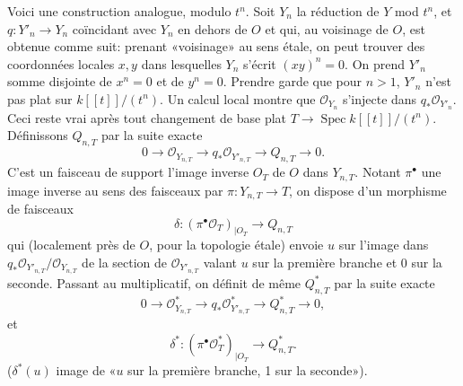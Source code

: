 \documentclass[11pt,leqno]{article}
\DeclareMathOperator{\Spec}{Spec}
\newcommand{\OO}{\mathcal O}
\begin{document}
Voici une construction analogue, modulo $t^n$. Soit $Y_n$ la réduction de $Y$ mod $t^n$, et $q:Y'_n\to Y_n$ coïncidant avec $Y_n$ en dehors de $O$ et qui, au voisinage de $O$, est obtenue comme suit: prenant «voisinage» au sens étale, on peut trouver des coordonnées locales $x,y$ dans lesquelles $Y_n$ s'écrit $(xy)^n=0$. On prend $Y'_n$ somme disjointe de $x^n=0$ et de $y^n=0$. Prendre garde que pour $n>1$, $Y'_n$ n'est pas plat sur $k[[t]]/(t^n)$. Un calcul local montre que $\OO_{Y_n}$ s'injecte dans $q_*\OO_{Y'_n}$. Ceci reste vrai après tout changement de base plat $T\to\Spec k[[t]]/(t^n)$. Définissons $Q_{n,T}$ par la suite exacte
\begin{equation}
        0\longrightarrow\OO_{Y_{n,T}}\longrightarrow q_*\OO_{Y'_{n,T}}\longrightarrow Q_{n,T}\longrightarrow0. \tag{2.4.2}
\end{equation}
C'est un faisceau de support l'image inverse $O_T$ de $O$ dans $Y_{n,T}$. Notant $\pi^\bullet$ une image inverse au sens des faisceaux par $\pi:Y_{n,T}\to T$, on dispose d'un morphisme de faisceaux
\begin{equation}
        \delta:(\pi^\bullet\OO_T)_{|O_T}\longrightarrow Q_{n,T} \tag{2.4.3}
\end{equation}
qui (localement près de $O$, pour la topologie étale) envoie $u$ sur l'image dans $q_*\OO_{Y'_{n,T}}/\OO_{Y_{n,T}}$ de la section de $\OO_{Y'_{n,T}}$ valant $u$ sur la première branche et 0 sur la seconde.
\clearpage
Passant au multiplicatif, on définit de même $Q^*_{n,T}$ par la suite exacte
\begin{equation}
        0\longrightarrow\OO^*_{Y_{n,T}}\longrightarrow q_*\OO^*_{Y'_{n,T}}\longrightarrow Q^*_{n,T}\longrightarrow0, \tag{2.4.4}
\end{equation}
et
\begin{equation}
        \delta^*:(\pi^\bullet\OO_T^*)_{|O_T}\longrightarrow Q^*_{n,T}. \tag{2.4.5}
\end{equation}
($\delta^*(u)$ image de «$u$ sur la première branche, 1 sur la seconde»).
\end{document}
